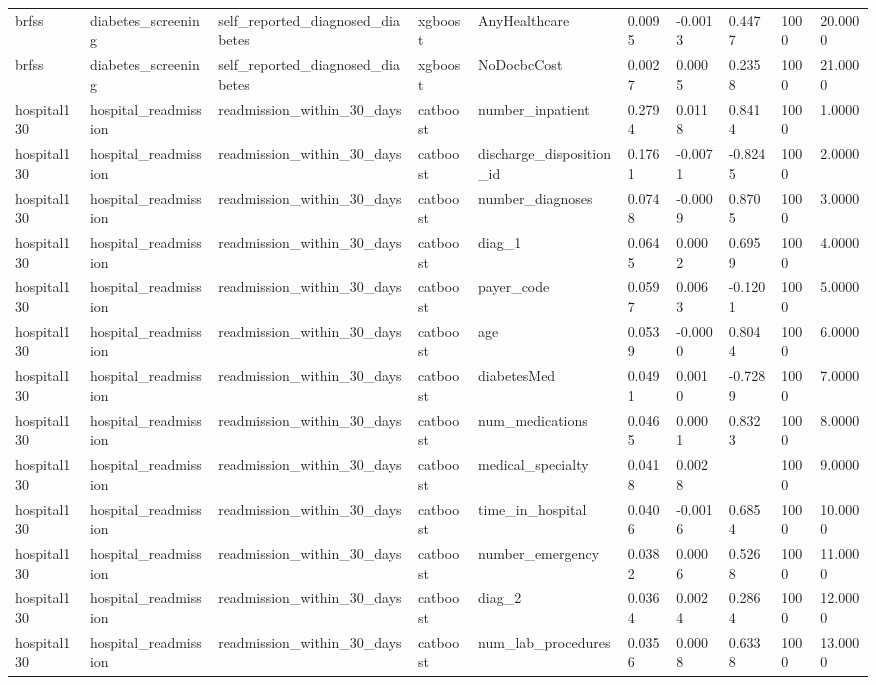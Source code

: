 \begin{tabular}{llllllllll}
brfss & diabetes\_screening & self\_reported\_diagnosed\_diabetes & xgboost & AnyHealthcare & 0.0095 & -0.0013 & 0.4477 & 1000 & 20.0000 \\
brfss & diabetes\_screening & self\_reported\_diagnosed\_diabetes & xgboost & NoDocbcCost & 0.0027 & 0.0005 & 0.2358 & 1000 & 21.0000 \\
hospital130 & hospital\_readmission & readmission\_within\_30\_days & catboost & number\_inpatient & 0.2794 & 0.0118 & 0.8414 & 1000 & 1.0000 \\
hospital130 & hospital\_readmission & readmission\_within\_30\_days & catboost & discharge\_disposition\_id & 0.1761 & -0.0071 & -0.8245 & 1000 & 2.0000 \\
hospital130 & hospital\_readmission & readmission\_within\_30\_days & catboost & number\_diagnoses & 0.0748 & -0.0009 & 0.8705 & 1000 & 3.0000 \\
hospital130 & hospital\_readmission & readmission\_within\_30\_days & catboost & diag\_1 & 0.0645 & 0.0002 & 0.6959 & 1000 & 4.0000 \\
hospital130 & hospital\_readmission & readmission\_within\_30\_days & catboost & payer\_code & 0.0597 & 0.0063 & -0.1201 & 1000 & 5.0000 \\
hospital130 & hospital\_readmission & readmission\_within\_30\_days & catboost & age & 0.0539 & -0.0000 & 0.8044 & 1000 & 6.0000 \\
hospital130 & hospital\_readmission & readmission\_within\_30\_days & catboost & diabetesMed & 0.0491 & 0.0010 & -0.7289 & 1000 & 7.0000 \\
hospital130 & hospital\_readmission & readmission\_within\_30\_days & catboost & num\_medications & 0.0465 & 0.0001 & 0.8323 & 1000 & 8.0000 \\
hospital130 & hospital\_readmission & readmission\_within\_30\_days & catboost & medical\_specialty & 0.0418 & 0.0028 &  & 1000 & 9.0000 \\
hospital130 & hospital\_readmission & readmission\_within\_30\_days & catboost & time\_in\_hospital & 0.0406 & -0.0016 & 0.6854 & 1000 & 10.0000 \\
hospital130 & hospital\_readmission & readmission\_within\_30\_days & catboost & number\_emergency & 0.0382 & 0.0006 & 0.5268 & 1000 & 11.0000 \\
hospital130 & hospital\_readmission & readmission\_within\_30\_days & catboost & diag\_2 & 0.0364 & 0.0024 & 0.2864 & 1000 & 12.0000 \\
hospital130 & hospital\_readmission & readmission\_within\_30\_days & catboost & num\_lab\_procedures & 0.0356 & 0.0008 & 0.6338 & 1000 & 13.0000 \\

\end{tabular}
